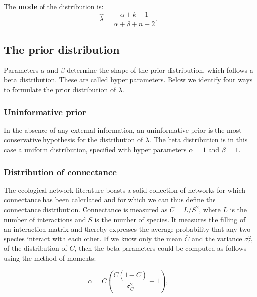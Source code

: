 \documentclass[12pt]{article}
\begin{document}
\begin{spacing}{2.0}
        The \textbf{mode} of the distribution is:
          \begin{equation}
            \hat{\lambda} = \frac{\alpha + k - 1}{\alpha + \beta + n - 2} .
            \label{mode}
          \end{equation}

    \subsection*{The prior distribution}    

      Parameters $\alpha$ and $\beta$ determine the shape of the prior distribution, which follows a beta distribution. These are called hyper parameters. Below we identify four ways to formulate the prior distribution of $\lambda$. 

      \subsubsection*{Uninformative prior}
        
          In the absence of any external information, an uninformative prior is the most conservative hypothesis for the distribution of $\lambda$. The beta distribution is in this case a uniform distribution, specified with hyper parameters $\alpha=1$ and $\beta=1$. 

      \subsubsection*{Distribution of connectance}
        
          The ecological network literature boasts a solid collection of networks for which connectance has been calculated and for which we can thus define the connectance distribution. Connectance is measured as $C = L/S^2$, where $L$ is the number of interactions and $S$ is the number of species. It measures the filling of an interaction matrix and thereby expresses the average probability that any two species interact with each other. If we know only the mean $\overline{C}$ and the variance $\sigma_C^2$ of the distribution of $C$,
          then the beta parameters could be computed as follows using the method of moments:

          \begin{equation}
          \alpha = \overline{C}(\frac{\overline{C}(1-\overline{C})}{\sigma_C^2}-1) ,
          \end{equation}


\end{spacing}
\end{document}
